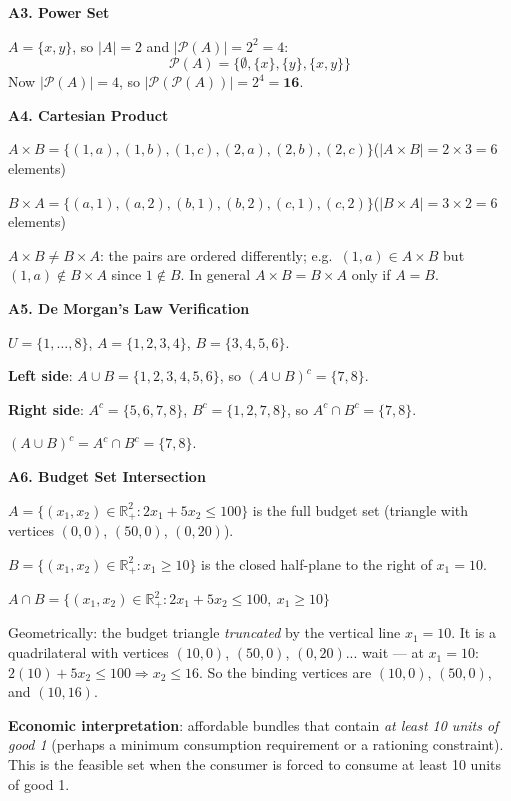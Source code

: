 \documentclass[12pt, a4paper]{article}
\theoremstyle{definition}
\newcommand{\R}{\mathbb{R}}
\newcommand{\powerset}{\mathcal{P}}
\begin{document}
\begin{solbox}
\textbf{A3. Power Set}

$A = \{x, y\}$, so $|A|=2$ and $|\powerset(A)| = 2^2 = 4$:
\[\powerset(A) = \{\emptyset, \{x\}, \{y\}, \{x,y\}\}\]
Now $|\powerset(A)| = 4$, so $|\powerset(\powerset(A))| = 2^4 = \mathbf{16}$.
\end{solbox}

\begin{solbox}
\textbf{A4. Cartesian Product}

$A\times B = \{(1,a),(1,b),(1,c),(2,a),(2,b),(2,c)\}$\quad ($|A\times B| = 2\times 3 = 6$ elements)

$B\times A = \{(a,1),(a,2),(b,1),(b,2),(c,1),(c,2)\}$\quad ($|B\times A| = 3\times 2 = 6$ elements)

$A\times B \neq B\times A$: the pairs are ordered differently; e.g.\ $(1,a)\in A\times B$ but $(1,a)\notin B\times A$ since $1\notin B$. In general $A\times B = B\times A$ only if $A = B$.
\end{solbox}

\begin{solbox}
\textbf{A5. De Morgan's Law Verification}

$U=\{1,\ldots,8\}$, $A=\{1,2,3,4\}$, $B=\{3,4,5,6\}$.

\textbf{Left side}: $A\cup B = \{1,2,3,4,5,6\}$, so $(A\cup B)^c = \{7,8\}$.

\textbf{Right side}: $A^c = \{5,6,7,8\}$, $B^c = \{1,2,7,8\}$, so $A^c\cap B^c = \{7,8\}$.

$(A\cup B)^c = A^c \cap B^c = \{7,8\}$. \checkmark
\end{solbox}

\begin{solbox}
\textbf{A6. Budget Set Intersection}

$A = \{(x_1,x_2)\in\R^2_+ : 2x_1+5x_2\leq 100\}$ is the full budget set (triangle with vertices $(0,0)$, $(50,0)$, $(0,20)$).

$B = \{(x_1,x_2)\in\R^2_+ : x_1 \geq 10\}$ is the closed half-plane to the right of $x_1=10$.

$A\cap B = \{(x_1,x_2)\in\R^2_+ : 2x_1+5x_2\leq 100,\ x_1\geq 10\}$

Geometrically: the budget triangle \emph{truncated} by the vertical line $x_1=10$. It is a quadrilateral with vertices $(10,0)$, $(50,0)$, $(0,20)$... wait --- at $x_1=10$: $2(10)+5x_2\leq 100 \Rightarrow x_2\leq 16$. So the binding vertices are $(10,0)$, $(50,0)$, and $(10,16)$.

\textbf{Economic interpretation}: affordable bundles that contain \emph{at least 10 units of good 1} (perhaps a minimum consumption requirement or a rationing constraint). This is the feasible set when the consumer is forced to consume at least 10 units of good 1.
\end{solbox}
\end{document}
